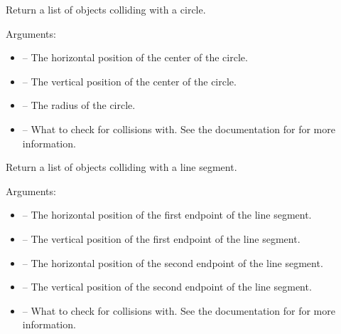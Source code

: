 \documentclass[letterpaper,10pt,english]{sphinxmanual}
\begin{document}

\begin{fulllineitems}
\label{collision:sge.collision.circle}
Return a list of objects colliding with a circle.

Arguments:
\begin{itemize}
\item {} 
 -- The horizontal position of the center of the circle.

\item {} 
 -- The vertical position of the center of the circle.

\item {} 
 -- The radius of the circle.

\item {} 
 -- What to check for collisions with.  See the
documentation for {\hyperref[dsp:sge.dsp.Object.collision]{\emph{}}} for more
information.

\end{itemize}

\end{fulllineitems}


\begin{fulllineitems}
\label{collision:sge.collision.line}
Return a list of objects colliding with a line segment.

Arguments:
\begin{itemize}
\item {} 
 -- The horizontal position of the first endpoint of the
line segment.

\item {} 
 -- The vertical position of the first endpoint of the line
segment.

\item {} 
 -- The horizontal position of the second endpoint of the
line segment.

\item {} 
 -- The vertical position of the second endpoint of the line
segment.

\item {} 
 -- What to check for collisions with.  See the
documentation for {\hyperref[dsp:sge.dsp.Object.collision]{\emph{}}} for more
information.

\end{itemize}

\end{fulllineitems}
\end{document}
